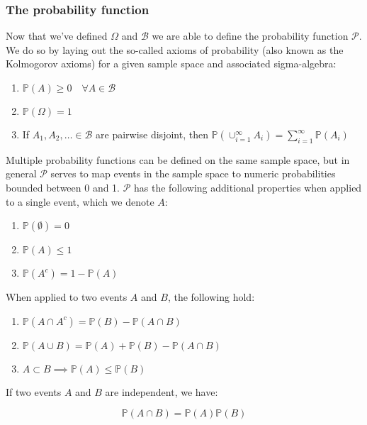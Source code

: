 \documentclass{report}
\begin{document}
\subsubsection{The probability function}

Now that we've defined $\Omega$ and $\mathcal{B}$ we are able to define the probability function $\mathcal{P}$. We do so by laying out the so-called axioms of probability (also known as the Kolmogorov axioms) for a given sample space and associated sigma-algebra:

\begin{enumerate}
    \item $\mathbb{P}(A) \geq 0 \quad \forall A \in \mathcal{B}$
    \item $\mathbb{P}(\Omega) = 1$
    \item If $A_1, A_2, \dots \in \mathcal{B}$ are pairwise disjoint, then $\mathbb{P} \left(\cup_{i=1}^\infty A_i\right) = \sum_{i=1}^\infty \mathbb{P}(A_i)$
\end{enumerate}

Multiple probability functions can be defined on the same sample space, but in general $\mathcal{P}$ serves to map events in the sample space to numeric probabilities bounded between 0 and 1. $\mathcal{P}$ has the following additional properties when applied to a single event, which we denote $A$:

\begin{enumerate}
    \item $\mathbb{P}(\emptyset) = 0$
    \item $\mathbb{P}(A) \leq 1$
    \item $\mathbb{P}(A^c) = 1 - \mathbb{P}(A)$
\end{enumerate}

When applied to two events $A$ and $B$, the following hold:

\begin{enumerate}
    \item $\mathbb{P}(A \cap A^c) = \mathbb{P}(B) - \mathbb{P}(A \cap B)$
    \item $\mathbb{P}(A \cup B) = \mathbb{P}(A) + \mathbb{P}(B) - \mathbb{P}(A \cap B)$
    \item $A \subset B \implies \mathbb{P}(A) \leq \mathbb{P}(B)$
\end{enumerate}

If two events $A$ and $B$ are independent, we have:

\begin{equation}\label{eq:independence-1}
    \mathbb{P}(A \cap B) = \mathbb{P}(A) \mathbb{P}(B)
\end{equation}
\end{document}
